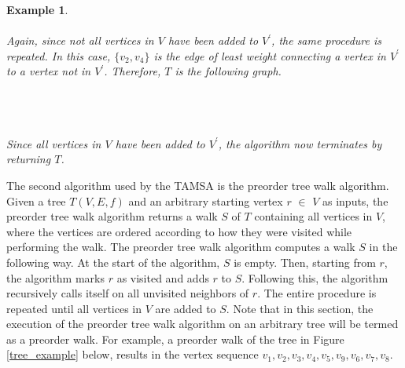 \documentclass{article}
\newtheorem{example}[definition]{Example}
\begin{document}
\begin{example}
\\\\
Again, since not all vertices in $V$ have been added to $V^\prime$, the same procedure is repeated. In this case, $\{v_2, v_4\}$ is the edge of least weight connecting a vertex in $V^\prime$ to a vertex not in $V^\prime$. Therefore, $T$ is the following graph.\\\\
\\\\
Since all vertices in $V$ have been added to $V^\prime$, the algorithm now terminates by returning $T$.
\end{example}
The second algorithm used by the TAMSA is the preorder tree walk algorithm. Given a tree $T(V,E,f)$ and an arbitrary starting vertex $r$ $\in$ $V$ as inputs, the preorder tree walk algorithm returns a walk $S$ of $T$ containing all vertices in $V$, where the vertices are ordered according to how they were visited while performing the walk. The preorder tree walk algorithm computes a walk $S$ in the following way. At the start of the algorithm, $S$ is empty. Then, starting from $r$, the algorithm marks $r$ as visited and adds $r$ to $S$. Following this, the algorithm recursively calls itself on all unvisited neighbors of $r$. The entire procedure is repeated until all vertices in $V$ are added to $S$. Note that in this section, the execution of the preorder tree walk algorithm on an arbitrary tree will be termed as a preorder walk. For example, a preorder walk of the tree in Figure \ref{tree_example} below, results in the vertex sequence $v_1, v_2, v_3, v_4, v_5, v_9, v_6, v_7, v_8$. \cite{cormen_leiserson_rivest_stein}\\\\
\end{document}
